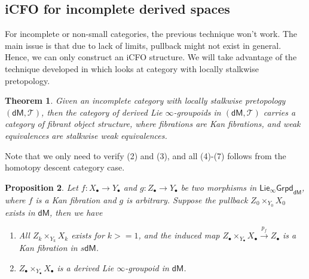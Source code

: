 \documentclass[12pt]{amsart}
\newtheorem{thm}{Theorem}[section]
\newtheorem{prop}[thm]{Proposition}
\theoremstyle{definition}
\theoremstyle{remark}
\numberwithin{equation}{section}
\newcommand{\1}{{\mathbb{1}}}
\newcommand{\dm}{\mathsf{dM}}
\newcommand{\ilgpd}{\mathsf{Lie_{\infty}Grpd}}
\newcommand{\bt}{\bullet}
\begin{document}
 




\subsection{iCFO for incomplete derived spaces}
For incomplete or non-small categories, the previous technique won't work. The main issue is that due to lack of limits, pullback might not exist in general. Hence, we can only construct an iCFO structure. We will take advantage of the technique developed in \cite{RZ20} which looks at category with locally stalkwise pretopology.

\begin{thm}
    Given an incomplete category with locally stalkwise pretopology $(\dm, \mathcal{T})$, then the category of derived Lie $\infty$-groupoids in $(\dm, \mathcal{T})$ carries a category of fibrant object structure, where fibrations are Kan fibrations, and weak equivalences are stalkwise weak equivalences.
 \end{thm}
 Note that we only need to verify (2) and (3), and all (4)-(7) follows from the homotopy descent category case.
 \begin{prop}
    Let $f: X_{\bt} \to Y_{\bt}$ and $g: Z_{\bt} \to Y_{\bt}$ be two morphisms in $\ilgpd_{\dm}$, where $f$ is a Kan fibration and $g$ is arbitrary. Suppose the pullback $Z_0\times_{Y_0} X_0$ exists in $\dm$, then we have
    \begin{enumerate}
        \item All $Z_k\times_{Y_k} X_k$ exists for $k >= 1$, and the induced map $Z_{\bt} \times_{Y_{\bt}} X_{\bt}\stackrel{p_f}{\rightarrow} Z_{\bt}$ is a Kan fibration in $s\dm$.
        \item $Z_{\bt} \times_{Y_{\bt}} X_{\bt}$ is a derived Lie $\infty$-groupoid in $\dm$.
    \end{enumerate}\end{prop}
    
\end{document}
